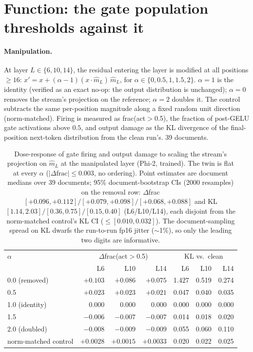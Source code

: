 \documentclass[11pt]{article}
\newcommand{\mhat}{\hat{m}}
\begin{document}
\section{Function: the gate population thresholds against it}
\label{sec:function}

\paragraph{Manipulation.} At layer $L \in \{6, 10, 14\}$, the residual
entering the layer is modified at all positions $\geq 16$:
$x' = x + (\alpha - 1)(x \cdot \mhat_L)\,\mhat_L$, for
$\alpha \in \{0, 0.5, 1, 1.5, 2\}$. $\alpha{=}1$ is the identity
(verified as an exact no-op: the output distribution is unchanged); $\alpha{=}0$ removes the
stream's projection on the reference; $\alpha{=}2$ doubles it. The
control subtracts the same per-position magnitude along a fixed random
unit direction (norm-matched). Firing is measured as frac(act$>$0.5),
the fraction of post-GELU gate activations above $0.5$, and output damage
as the KL divergence of the final-position next-token distribution from
the clean run's. 39 documents.

\begin{table}[t]
\centering
\small
\begin{tabular}{lrrrrrr}
\toprule
$\alpha$ & \multicolumn{3}{c}{$\Delta$frac(act$>$0.5)} &
\multicolumn{3}{c}{KL vs.\ clean} \\
 & L6 & L10 & L14 & L6 & L10 & L14 \\
\midrule
0.0 (removed) & $+0.103$ & $+0.086$ & $+0.075$ & 1.427 & 0.519 & 0.274 \\
0.5 & $+0.023$ & $+0.023$ & $+0.021$ & 0.047 & 0.040 & 0.035 \\
1.0 (identity) & 0.000 & 0.000 & 0.000 & 0.000 & 0.000 & 0.000 \\
1.5 & $-0.006$ & $-0.007$ & $-0.007$ & 0.014 & 0.018 & 0.020 \\
2.0 (doubled) & $-0.008$ & $-0.009$ & $-0.009$ & 0.055 & 0.060 & 0.110 \\
\midrule
norm-matched control & $+0.0028$ & $+0.0015$ & $+0.0033$ & 0.020 & 0.022 &
0.025 \\
\bottomrule
\end{tabular}
\caption{Dose-response of gate firing and output damage to scaling the
stream's projection on $\mhat_L$ at the manipulated layer (Phi-2,
trained). The twin is flat at every $\alpha$
($|\Delta\text{frac}| \leq 0.003$, no ordering). Point estimates are
document medians over 39 documents; 95\% document-bootstrap CIs (2000
resamples) on the removal row: $\Delta$frac
$[+0.096,+0.112]/[+0.079,+0.098]/[+0.068,+0.088]$ and KL
$[1.14,2.03]/[0.36,0.75]/[0.15,0.40]$ (L6/L10/L14), each disjoint from
the norm-matched control's KL CI ($\leq [0.010,0.032]$). The
document-sampling spread on KL dwarfs the run-to-run fp16 jitter
($\sim$1\%), so only the leading two digits are informative.}
\label{tab:dose}
\end{table}
\end{document}
